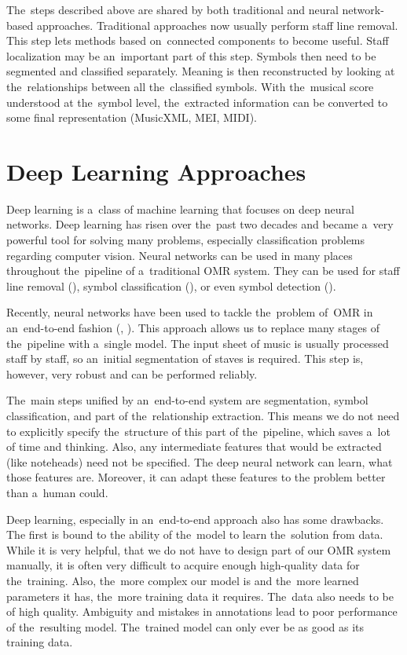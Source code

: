 The~steps described above are shared by both traditional and neural network-based approaches. Traditional approaches now usually perform staff line removal. This step lets methods based on~connected components to become useful. Staff localization may be an~important part of this step. Symbols then need to be segmented and classified separately. Meaning is then reconstructed by looking at the~relationships between all the~classified symbols. With the~musical score understood at the~symbol level, the~extracted information can be converted to some final representation (MusicXML, MEI, MIDI).


\section{Deep Learning Approaches}

Deep learning is a~class of machine learning that focuses on deep neural networks. Deep learning has risen over the~past two decades and became a~very powerful tool for solving many problems, especially classification problems regarding computer vision. Neural networks can be used in many places throughout the~pipeline of a~traditional OMR system. They can be used for staff line removal (\cite{CalvoZaragoza2017}), symbol classification (\cite{Lee2016}), or even symbol detection (\cite{Pacha2018}).

Recently, neural networks have been used to tackle the~problem of~OMR in an~end-to-end fashion (\cite{Primus}, \cite{HmrBaseline}). This approach allows us to replace many stages of the~pipeline with a~single model. The input sheet of music is usually processed staff by staff, so an~initial segmentation of staves is required. This step is, however, very robust and can be performed reliably.

The~main steps unified by an~end-to-end system are segmentation, symbol classification, and part of the~relationship extraction. This means we do not need to explicitly specify the~structure of this part of the~pipeline, which saves a~lot of time and thinking. Also, any intermediate features that would be extracted (like noteheads) need not be specified. The deep neural network can learn, what those features are. Moreover, it can adapt these features to the problem better than a~human could.

Deep learning, especially in an~end-to-end approach also has some drawbacks. The first is bound to the ability of the~model to learn the~solution from data. While it is very helpful, that we do not have to design part of our OMR system manually, it is often very difficult to acquire enough high-quality data for the~training. Also, the~more complex our model is and the~more learned parameters it has, the~more training data it requires. The~data also needs to be of high quality. Ambiguity and mistakes in annotations lead to poor performance of the~resulting model. The~trained model can only ever be as good as its training data.

